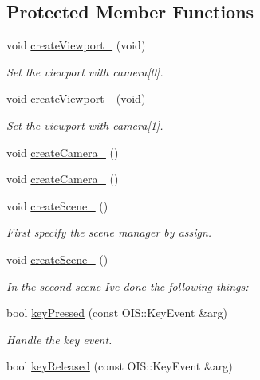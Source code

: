\subsection*{Protected Member Functions}
\begin{DoxyCompactItemize}
\item 
void \hyperlink{class_basic_tutorial__00_a6d4684502f2f7b2cf628a975d7750d8e}{create\+Viewport\+\_} (void)
\begin{DoxyCompactList}\small\item\em Set the viewport with camera\mbox{[}0\mbox{]}. \end{DoxyCompactList}\item 
void \hyperlink{class_basic_tutorial__00_a2801a2f0d91d80b471da48344d2ccccf}{create\+Viewport\+\_} (void)
\begin{DoxyCompactList}\small\item\em Set the viewport with camera\mbox{[}1\mbox{]}. \end{DoxyCompactList}\item 
void \hyperlink{class_basic_tutorial__00_a3479c50dbf8dc06a7ea77014eb94c6e7}{create\+Camera\+\_} ()
\item 
void \hyperlink{class_basic_tutorial__00_a8745a127adeb69fa769f832fd41412c0}{create\+Camera\+\_} ()
\item 
void \hyperlink{class_basic_tutorial__00_aa84173e509858146cbfb98274c1ef56e}{create\+Scene\+\_} ()
\begin{DoxyCompactList}\small\item\em First specify the scene manager by assign. \end{DoxyCompactList}\item 
void \hyperlink{class_basic_tutorial__00_aad14e1ca565797c4b7dcff31bc0e1494}{create\+Scene\+\_} ()
\begin{DoxyCompactList}\small\item\em In the second scene I\textquotesingle{}ve done the following things\+: \end{DoxyCompactList}\item 
bool \hyperlink{class_basic_tutorial__00_adc1a0b32d78b1980b3ee51a1b1e1e69b}{key\+Pressed} (const O\+I\+S\+::\+Key\+Event \&arg)
\begin{DoxyCompactList}\small\item\em Handle the key event. \end{DoxyCompactList}\item 
bool \hyperlink{class_basic_tutorial__00_aacca7a0a2a5a0e0d007b9c6c30b4941b}{key\+Released} (const O\+I\+S\+::\+Key\+Event \&arg)
\end{DoxyCompactItemize}
